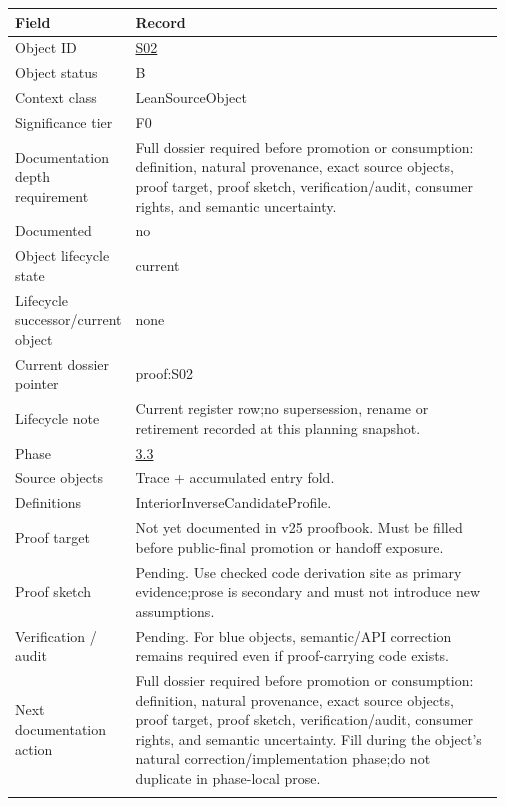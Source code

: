 \begin{longtable}{L{0.16\linewidth} L{0.81\linewidth}}
\hline
\textbf{Field} & \textbf{Record}\\
\hline
Object ID & \hyperlink{object-row-S02}{S02}\\
\hline\addlinespace[0.20em]
Object status & B\\
\hline\addlinespace[0.20em]
Context class & LeanSourceObject\\
\hline\addlinespace[0.20em]
Significance tier & F0\\
\hline\addlinespace[0.20em]
Documentation depth requirement & Full dossier required before promotion or consumption: definition, natural provenance, exact source objects, proof target, proof sketch, verification/\allowbreak{}audit, consumer rights, and semantic uncertainty.\\
\hline\addlinespace[0.20em]
Documented & no\\
\hline\addlinespace[0.20em]
Object lifecycle state & current\\
\hline\addlinespace[0.20em]
Lifecycle successor/\allowbreak{}current object & none\\
\hline\addlinespace[0.20em]
Current dossier pointer & proof:S02\\
\hline\addlinespace[0.20em]
Lifecycle note & Current register row;\newline no supersession, rename or retirement recorded at this planning snapshot.\\
\hline\addlinespace[0.20em]
Phase & \hyperlink{phase-row-3-3}{3.3}\\
\hline\addlinespace[0.20em]
Source objects & Trace + accumulated entry fold.\\
\hline\addlinespace[0.20em]
Definitions & InteriorInverseCandidateProfile.\\
\hline\addlinespace[0.20em]
Proof target & Not yet documented in v25 proofbook. Must be filled before public-final promotion or handoff exposure.\\
\hline\addlinespace[0.20em]
Proof sketch & Pending. Use checked code derivation site as primary evidence;\newline prose is secondary and must not introduce new assumptions.\\
\hline\addlinespace[0.20em]
Verification /\allowbreak{} audit & Pending. For blue objects, semantic/\allowbreak{}API correction remains required even if proof-carrying code exists.\\
\hline\addlinespace[0.20em]
Next documentation action & Full dossier required before promotion or consumption: definition, natural provenance, exact source objects, proof target, proof sketch, verification/\allowbreak{}audit, consumer rights, and semantic uncertainty. Fill during the object's natural correction/\allowbreak{}implementation phase;\newline do not duplicate in phase-local prose.\\
\hline\addlinespace[0.20em]
\end{longtable}
